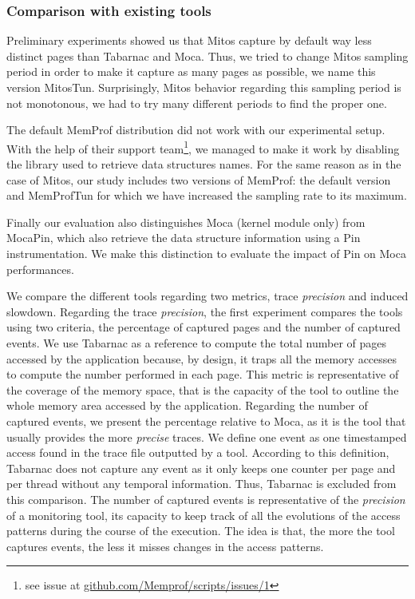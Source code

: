 \subsubsection{Comparison with existing tools}
\label{sec:expe-ovh}

Preliminary experiments showed us that \gls{Mitos} capture by
default way less distinct pages than \gls{Tabarnac} and \gls{Moca}. Thus, we tried to change \gls{Mitos}
sampling period in order to make it capture as many pages as possible, 
we name this version MitosTun. Surprisingly, \gls{Mitos} behavior regarding this sampling period
is not monotonous, we had to try many different periods to find the proper one.

The default \gls{MemProf} distribution did not work with our experimental setup. With the help
of their support team\footnote{see issue at
    \href{https://github.com/Memprof/scripts/issues/1}{github.com/Memprof/scripts/issues/1}}, we managed to make it work by disabling the library used to retrieve
data structures names. For the same reason as in the case of \gls{Mitos}, our study includes
two versions of \gls{MemProf}: the default version and MemProfTun for which we have
increased the sampling rate to its maximum.

Finally our evaluation also distinguishes \gls{Moca} (kernel module only) from
\gls{Moca}Pin, which also retrieve the data structure information using a Pin
instrumentation. We make this distinction to evaluate the impact of Pin on
\gls{Moca} performances.

We compare the different tools regarding two metrics, trace \emph{precision} and induced slowdown. Regarding the trace \emph{precision}, the first experiment compares the tools
using two criteria, the
percentage of captured pages and the number of captured events.  We use \gls{Tabarnac} as a reference to compute the total number of pages accessed by the
application because, by design, it traps all the memory accesses to compute the number performed in each page. This metric is representative of the coverage of the
memory space, that is the capacity of the tool to outline the whole memory area accessed by the application. Regarding the number of captured events, we present the percentage
relative to \gls{Moca}, as it is the tool that usually provides the more \emph{precise} traces. We define one event as one
timestamped access found in the trace file outputted by a tool. According to this definition, \gls{Tabarnac} does not capture any event as it only keeps one
counter per page and per thread without any temporal information. Thus, \gls{Tabarnac} is excluded from this comparison. The number of captured events is representative
of the \emph{precision} of a monitoring tool, its capacity to keep track of all the evolutions of the access patterns during the course of the execution. The idea is
that, the more the tool captures events, the less it misses changes in the access patterns.

